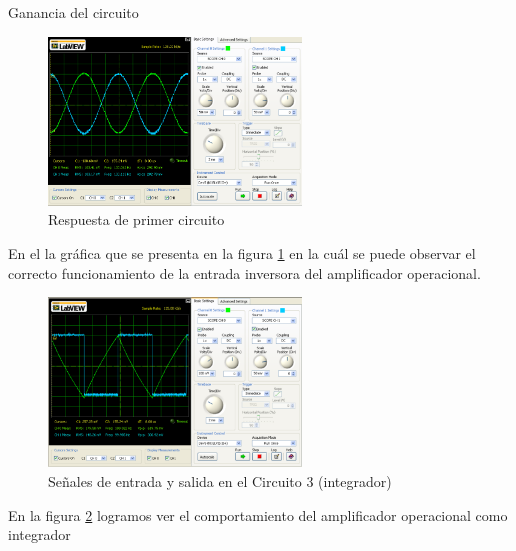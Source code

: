 \documentclass[]{article}
\begin{document}
Ganancia del circuito


\begin{figure}[h!]
	\centering
	\includegraphics[width=0.6\textwidth]{Imagenes/primerCircuito.png}
	\caption{Respuesta de primer circuito}
	\label{fig:primerCircuito}
\end{figure}

En el la gráfica que se presenta en la figura \ref{fig:primerCircuito} en la cuál se puede observar el correcto funcionamiento de la entrada inversora del amplificador operacional.\\



\begin{figure}[h!]
	\centering
	\includegraphics[width=0.6\textwidth]{Imagenes/circuito3.png}
	\caption{Señales de entrada y salida en el Circuito 3 (integrador)}
	\label{fig:circuito3}
\end{figure}

En la figura \ref{fig:circuito3} logramos ver el comportamiento del amplificador operacional como integrador
\end{document}
